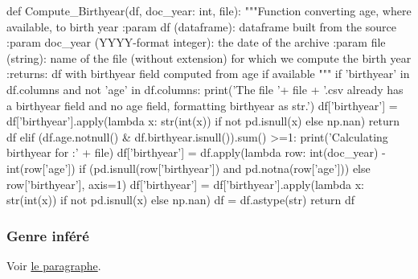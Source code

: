 \documentclass[a4paper,12pt,twoside]{book}
\begin{document}
    		    \begin{python}
def Compute_Birthyear(df, doc_year: int, file):
  """Function converting age, where available, to birth year
  :param df (dataframe): dataframe built from the source
  :param doc_year (YYYY-format integer): the date of the archive
  :param file (string): name of the file (without extension) for which we compute the birth year
  :returns: df with birthyear field computed from age if available
  """
  if 'birthyear' in df.columns and not 'age' in df.columns:
    print('The file '+ file + '.csv already has a birthyear field and no age field, formatting birthyear as str.')
    df['birthyear'] = df['birthyear'].apply(lambda x: str(int(x)) if not pd.isnull(x) else np.nan)
    return df
  elif (df.age.notnull() & df.birthyear.isnull()).sum() >=1:
    print('Calculating birthyear for :' + file)
    df['birthyear'] = df.apply(lambda row: int(doc_year) - int(row['age']) if (pd.isnull(row['birthyear']) and pd.notna(row['age'])) else row['birthyear'], axis=1)
    df['birthyear'] = df['birthyear'].apply(lambda x: str(int(x)) if not pd.isnull(x) else np.nan)
    df = df.astype(str)
  return df
	        \end{python}
	        \pagebreak
	        
            \subsubsection{Genre inféré}
    	        Voir \hyperref[gender]{le paragraphe}.
    		    \label{gender_code}
    		    
\end{document}
